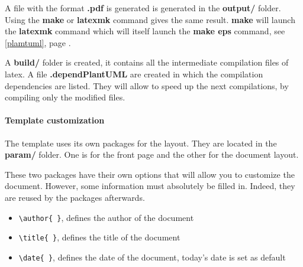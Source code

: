 A file with the format \textbf{.pdf} is generated is generated in the \textbf{output/} folder.
Using the \textbf{make} or \textbf{latexmk} command gives the same result.
\textbf{make} will launch the \textbf{latexmk} command which will itself launch the \textbf{make eps} command, see \ref{plamtuml}, page \pageref{plamtuml}.\newline

A \textbf{build/} folder is created, it contains all the intermediate compilation files of \gls{latex}.
A file \textbf{.dependPlantUML} are created in which the compilation dependencies are listed.
They will allow to speed up the next compilations, by compiling only the modified files.

\paragraph{Template customization}
The template uses its own packages for the layout.
They are located in the \textbf{param/} folder.
One is for the front page and the other for the document layout.

These two packages have their own options that will allow you to customize the document.
However, some information must absolutely be filled in. Indeed, they are reused by the packages afterwards.
\begin{itemize}
    \item \verb=\author{ }=, defines the author of the document
    \item \verb=\title{ }=, defines the title of the document
    \item \verb=\date{ }=, defines the date of the document, today's date is set as default
\end{itemize}


